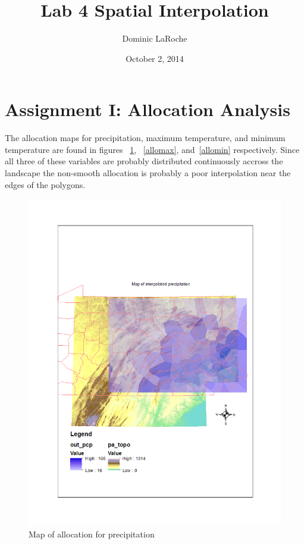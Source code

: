 \documentclass{article}\usepackage[]{graphicx}\usepackage[]{color}
\title{Lab 4 Spatial Interpolation}
\author{Dominic LaRoche}
\date{October 2, 2014}
\begin{document}
\maketitle

\tableofcontents

\section{Assignment I: Allocation Analysis}
The allocation maps for precipitation, maximum temperature, and minimum temperature are found in figures ~\ref{alloprecip}, ~\ref{allomax}, and~\ref{allomin} respectively.  Since all three of these variables are probably distributed continuously accross the landscape the non-smooth allocation is probably a poor interpolation near the edges of the polygons.\\

\begin{figure}
\includegraphics[scale=.9]{./figure/Precip}
\caption{Map of allocation for precipitation}
\label{alloprecip}
\end{figure}
\end{document}
